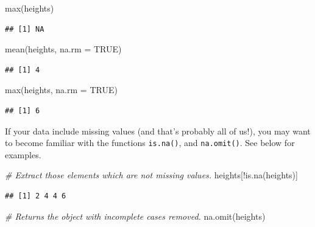 \documentclass[
]{book}
\newenvironment{Shaded}{\begin{snugshade}}{\end{snugshade}}
\newcommand{\AttributeTok}[1]{\textcolor[rgb]{0.77,0.63,0.00}{#1}}
\newcommand{\CommentTok}[1]{\textcolor[rgb]{0.56,0.35,0.01}{\textit{#1}}}
\newcommand{\ConstantTok}[1]{\textcolor[rgb]{0.00,0.00,0.00}{#1}}
\newcommand{\FunctionTok}[1]{\textcolor[rgb]{0.00,0.00,0.00}{#1}}
\newcommand{\NormalTok}[1]{#1}
\newcommand{\SpecialCharTok}[1]{\textcolor[rgb]{0.00,0.00,0.00}{#1}}
\begin{document}
\begin{Shaded}
\begin{Highlighting}[]
\FunctionTok{max}\NormalTok{(heights)}
\end{Highlighting}
\end{Shaded}

\begin{verbatim}
## [1] NA
\end{verbatim}

\begin{Shaded}
\begin{Highlighting}[]
\FunctionTok{mean}\NormalTok{(heights, }\AttributeTok{na.rm =} \ConstantTok{TRUE}\NormalTok{)}
\end{Highlighting}
\end{Shaded}

\begin{verbatim}
## [1] 4
\end{verbatim}

\begin{Shaded}
\begin{Highlighting}[]
\FunctionTok{max}\NormalTok{(heights, }\AttributeTok{na.rm =} \ConstantTok{TRUE}\NormalTok{)}
\end{Highlighting}
\end{Shaded}

\begin{verbatim}
## [1] 6
\end{verbatim}

If your data include missing values (and that's probably all of us!), you may want to become familiar with the functions \texttt{is.na()}, and \texttt{na.omit()}. See below for examples.

\begin{Shaded}
\begin{Highlighting}[]
\CommentTok{\# Extract those elements which are not missing values.}
\NormalTok{heights[}\SpecialCharTok{!}\FunctionTok{is.na}\NormalTok{(heights)]}
\end{Highlighting}
\end{Shaded}

\begin{verbatim}
## [1] 2 4 4 6
\end{verbatim}

\begin{Shaded}
\begin{Highlighting}[]
\CommentTok{\# Returns the object with incomplete cases removed.}
\FunctionTok{na.omit}\NormalTok{(heights)}
\end{Highlighting}
\end{Shaded}
\end{document}
